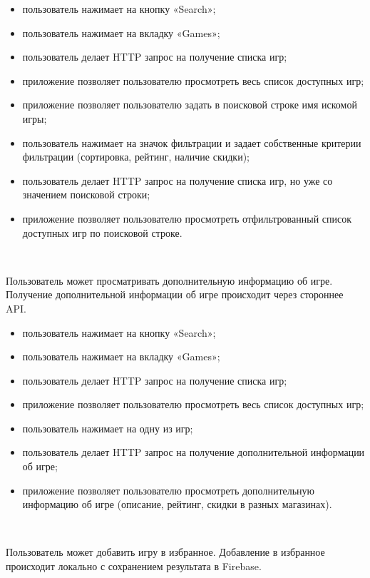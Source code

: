 \begin{itemize}
  \item пользователь нажимает на кнопку «Search»;
  \item пользователь нажимает на вкладку «Games»;
  \item пользователь делает HTTP запрос на получение списка игр;
  \item приложение позволяет пользователю просмотреть весь список доступных игр;
  \item приложение позволяет пользователю задать в поисковой строке имя искомой игры;
  \item пользователь нажимает на значок фильтрации и задает собственные критерии фильтрации (сортировка, рейтинг, наличие скидки);
  \item пользователь делает HTTP запрос на получение списка игр, но уже со значением поисковой строки;
  \item приложение позволяет пользователю просмотреть отфильтрованный список доступных игр по поисковой строке.
\end{itemize}

~\par

Пользователь может просматривать дополнительную информацию об игре. Получение дополнительной информации об игре происходит через стороннее API.

\begin{itemize}
  \item пользователь нажимает на кнопку «Search»;
  \item пользователь нажимает на вкладку «Games»;
  \item пользователь делает HTTP запрос на получение списка игр;
  \item приложение позволяет пользователю просмотреть весь список доступных игр;
  \item пользователь нажимает на одну из игр;
  \item пользователь делает HTTP запрос на получение дополнительной информации об игре;
  \item приложение позволяет пользователю просмотреть дополнительную информацию об игре (описание, рейтинг, скидки в разных магазинах).
\end{itemize}


~\par

Пользователь может добавить игру в избранное. Добавление в избранное происходит локально с сохранением результата в Firebase.

